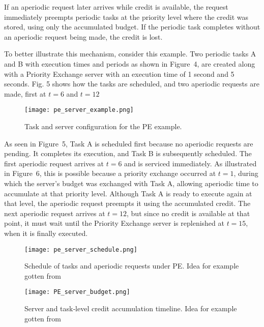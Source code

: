 \documentclass[conference]{IEEEtran}
\begin{document}
If an aperiodic request later arrives while credit is available, the request immediately preempts periodic tasks at the priority level where the credit was stored, using only the accumulated budget. If the periodic task completes without an aperiodic request being made, the credit is lost.

To better illustrate this mechanism, consider this example. Two periodic tasks A and B with execution times and periods as shown in Figure~4, are created along with a Priority Exchange server with an execution time of 1 second and 5 seconds. Fig. 5 shows how the tasks are scheduled, and two aperiodic requests are made, first at $t = 6$ and $t = 12$

\begin{figure}[!t]
  \centering
  \texttt{[image: pe\_server\_example.png]}
  \caption{Task and server configuration for the PE example.}
  \label{fig:pe_server_example}
\end{figure}

As seen in Figure~5, Task A is scheduled first because no aperiodic requests are pending. It completes its execution, and Task B is subsequently scheduled. The first aperiodic request arrives at $t = 6$ and is serviced immediately. As illustrated in Figure~6, this is possible because a priority exchange occurred at $t = 1$, during which the server's budget was exchanged with Task A, allowing aperiodic time to accumulate at that priority level. Although Task A is ready to execute again at that level, the aperiodic request preempts it using the accumulated credit. The next aperiodic request arrives at $t = 12$, but since no credit is available at that point, it must wait until the Priority Exchange server is replenished at $t = 15$, when it is finally executed.

\begin{figure*}[!t]
  \centering
  \texttt{[image: pe\_server\_schedule.png]}
  \caption{Schedule of tasks and aperiodic requests under PE. Idea for example gotten from \cite{sprunt1990aperiodic}}
  \label{fig:pe_server_schedule}
\end{figure*}

\begin{figure*}[!t]
  \centering
  \texttt{[image: PE\_server\_budget.png]}
  \caption{Server and task‐level credit accumulation timeline. Idea for example gotten from \cite{sprunt1990aperiodic}}
  \label{fig:pe_server_budget}
\end{figure*}
\end{document}
